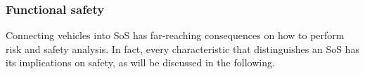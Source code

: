
\subsubsection{Functional safety} 
%



Connecting vehicles into SoS has far-reaching consequences on how to perform risk and safety analysis. In fact, every characteristic that distinguishes an SoS \cite{maier1996sos} has its implications on safety, as will be discussed in the following.

